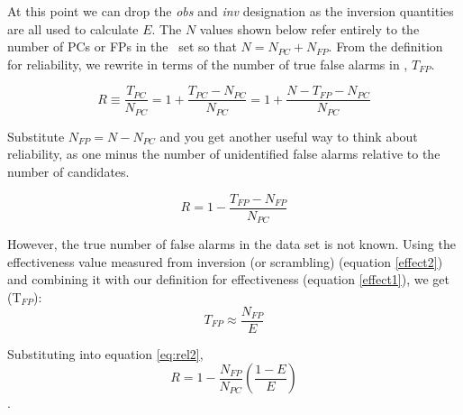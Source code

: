 At this point we can drop the \textit{obs} and \textit{inv} designation as the inversion quantities are all used to calculate $E$. The $N$ values shown below refer entirely to the number of PCs or FPs in the \opstce\ set so that $N=N_{PC} + N_{FP}$. From the definition for reliability, we rewrite in terms of the number of true false alarms in \opstce, $T_{FP}$.

\begin{equation}
R \equiv \frac{T_{PC}}{N_{PC}} =  1 + \frac{T_{PC}-N_{PC}}{N_{PC}} 
= 1 + \frac{N - T_{FP} - N_{PC}}{N_{PC}}
\end{equation}

Substitute $N_{FP}=N-N_{PC}$ and you get another useful way to think about reliability, as one minus the number of unidentified false alarms relative to the number of candidates.

\begin{equation}
\label{eq:rel2}
R = 1 - \frac{T_{FP}-N_{FP}}{N_{PC}}
\end{equation}

However, the true number of false alarms in the \opstce{} data set is not known. Using the effectiveness value measured from inversion (or scrambling) (equation \ref{effect2}) and combining it with our definition for effectiveness (equation \ref{effect1}), we get (T$_{FP}$):
\begin{equation}
T_{FP} \approx \frac{N_{FP}}{E} 
\end{equation}

Substituting into equation \ref{eq:rel2},
\textbf{
\begin{equation}
R= 1 - \frac{N_{FP}}{N_{PC}}\left(\frac{1-E}{E}\right)
\end{equation}
}.




